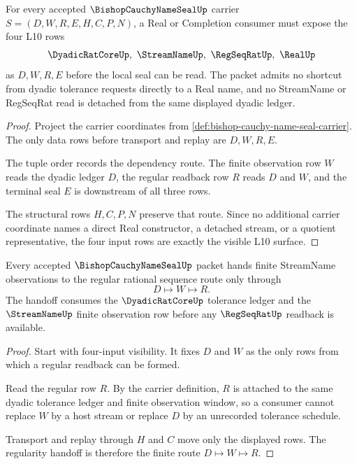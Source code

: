 \begin{theorem}
\label{thm:bishop-cauchy-name-seal-four-input-visibility}
For every accepted $\BishopCauchyNameSealUp$ carrier $S=(D,W,R,E,H,C,P,N)$, a Real or Completion consumer must expose the four L10 rows
$$
\DyadicRatCoreUp,\ \StreamNameUp,\ \RegSeqRatUp,\ \RealUp
$$
as $D,W,R,E$ before the local seal can be read. The packet admits no shortcut from dyadic tolerance requests directly to a Real name, and no StreamName or RegSeqRat read is detached from the same displayed dyadic ledger.
\end{theorem}
\begin{proof}
Project the carrier coordinates from \autoref{def:bishop-cauchy-name-seal-carrier}. The only data rows before transport and replay are $D,W,R,E$.

The tuple order records the dependency route. The finite observation row $W$ reads the dyadic ledger $D$, the regular readback row $R$ reads $D$ and $W$, and the terminal seal $E$ is downstream of all three rows.

The structural rows $H,C,P,N$ preserve that route. Since no additional carrier coordinate names a direct Real constructor, a detached stream, or a quotient representative, the four input rows are exactly the visible L10 surface.
\end{proof}

\begin{theorem}
\label{thm:bishop-cauchy-name-seal-regularity-handoff}
Every accepted $\BishopCauchyNameSealUp$ packet hands finite StreamName observations to the regular rational sequence route only through
$$
D\longmapsto W\longmapsto R .
$$
The handoff consumes the $\DyadicRatCoreUp$ tolerance ledger and the $\StreamNameUp$ finite observation row before any $\RegSeqRatUp$ readback is available.
\end{theorem}
\begin{proof}
Start with four-input visibility. It fixes $D$ and $W$ as the only rows from which a regular readback can be formed.

Read the regular row $R$. By the carrier definition, $R$ is attached to the same dyadic tolerance ledger and finite observation window, so a consumer cannot replace $W$ by a host stream or replace $D$ by an unrecorded tolerance schedule.

Transport and replay through $H$ and $C$ move only the displayed rows. The regularity handoff is therefore the finite route $D\longmapsto W\longmapsto R$.
\end{proof}

